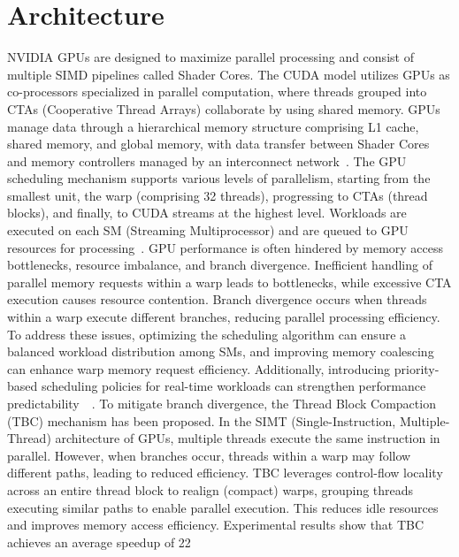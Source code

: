 \section{Architecture}
\cite{Jog2013OWL}
NVIDIA GPUs are designed to maximize parallel processing and consist of multiple SIMD pipelines called Shader Cores. The CUDA model utilizes GPUs as co-processors specialized in parallel computation, where threads grouped into CTAs (Cooperative Thread Arrays) collaborate by using shared memory. GPUs manage data through a hierarchical memory structure comprising L1 cache, shared memory, and global memory, with data transfer between Shader Cores and memory controllers managed by an interconnect network~\cite{Bakhoda2009}. The GPU scheduling mechanism supports various levels of parallelism, starting from the smallest unit, the warp (comprising 32 threads), progressing to CTAs (thread blocks), and finally, to CUDA streams at the highest level. Workloads are executed on each SM (Streaming Multiprocessor) and are queued to GPU resources for processing~\cite{Sanudo2020}.
GPU performance is often hindered by memory access bottlenecks, resource imbalance, and branch divergence. Inefficient handling of parallel memory requests within a warp leads to bottlenecks, while excessive CTA execution causes resource contention. Branch divergence occurs when threads within a warp execute different branches, reducing parallel processing efficiency. To address these issues, optimizing the scheduling algorithm can ensure a balanced workload distribution among SMs, and improving memory coalescing can enhance warp memory request efficiency. Additionally, introducing priority-based scheduling policies for real-time workloads can strengthen performance predictability~\cite{Bakhoda2009}~\cite{Sanudo2020}.
To mitigate branch divergence, the Thread Block Compaction (TBC) mechanism has been proposed. In the SIMT (Single-Instruction, Multiple-Thread) architecture of GPUs, multiple threads execute the same instruction in parallel. However, when branches occur, threads within a warp may follow different paths, leading to reduced efficiency. TBC leverages control-flow locality across an entire thread block to realign (compact) warps, grouping threads executing similar paths to enable parallel execution. This reduces idle resources and improves memory access efficiency. Experimental results show that TBC achieves an average speedup of 22%
